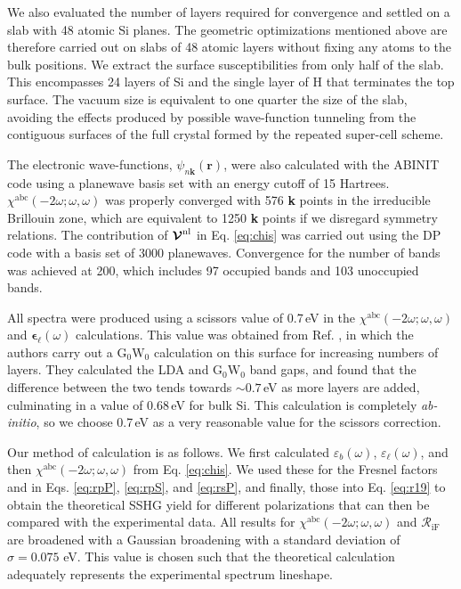 \documentclass[prb,superscriptaddress,showpacs,twocolumn,letterpaper]{revtex4}
\begin{document}
We also evaluated the number of layers required for convergence and settled on a
slab with 48 atomic Si planes. The geometric optimizations mentioned above are
therefore carried out on slabs of 48 atomic layers without fixing any atoms to
the bulk positions. We extract the surface susceptibilities from only half of
the slab. This encompasses 24 layers of Si and the single layer of H that
terminates the top surface. The vacuum size is equivalent to one quarter the
size of the slab, avoiding the effects produced by possible wave-function
tunneling from the contiguous surfaces of the full crystal formed by the
repeated super-cell scheme.\cite{mendozaPRB06}

The electronic wave-functions, $\psi_{n\mathbf{k}}(\mathbf{r})$, were also
calculated with the ABINIT code using a planewave basis set with an energy
cutoff of 15 Hartrees. $\chi^{\mathrm{abc}}(-2\omega;\omega,\omega)$ was
properly converged with 576 \textbf{k} points in the irreducible Brillouin zone,
which are equivalent to 1250 \textbf{k} points if we disregard symmetry
relations. The contribution of $\boldsymbol{\mathcal{\cal V}}^\mathrm{nl}$ in
Eq. \eqref{eq:chis} was carried out using the DP\cite{olevanoDP} code with a
basis set of 3000 planewaves. Convergence for the number of bands was achieved
at 200, which includes 97 occupied bands and 103 unoccupied bands.

All spectra were produced using a scissors value of 0.7\,eV in the
$\chi^{\mathrm{abc}}(-2\omega;\omega,\omega)$ and
$\boldsymbol{\epsilon}_{\ell}(\omega)$ calculations. This value was obtained
from Ref. , in which the authors carry out a
$\mathrm{G}_{0}\mathrm{W}_{0}$ calculation on this surface for increasing
numbers of layers. They calculated the LDA and $\mathrm{G}_{0}\mathrm{W}_{0}$
band gaps, and found that the difference between the two tends towards
$\sim0.7$\,eV as more layers are added, culminating in a value of 0.68\,eV for
bulk Si. This calculation is completely \emph{ab-initio}, so we choose 0.7\,eV
as a very reasonable value for the scissors correction.

Our method of calculation is as follows. We first calculated
$\varepsilon_{b}(\omega)$, $\varepsilon_{\ell}(\omega)$, and then
$\chi^{\mathrm{abc}}(-2\omega;\omega,\omega)$ from Eq. \eqref{eq:chis}. We used
these for the Fresnel factors and in Eqs. \eqref{eq:rpP}, \eqref{eq:rpS}, and
\eqref{eq:rsP}, and finally, those into Eq. \eqref{eq:r19} to obtain the
theoretical SSHG yield for different polarizations that can then be compared
with the experimental data. All results for
$\chi^{\mathrm{abc}}(-2\omega;\omega,\omega)$ and ${\mathcal R_{\mathrm{iF}}}$
are broadened with a Gaussian broadening with a standard deviation of
$\sigma=0.075$ eV. This value is chosen such that the theoretical calculation
adequately  represents the experimental spectrum lineshape.
\end{document}
